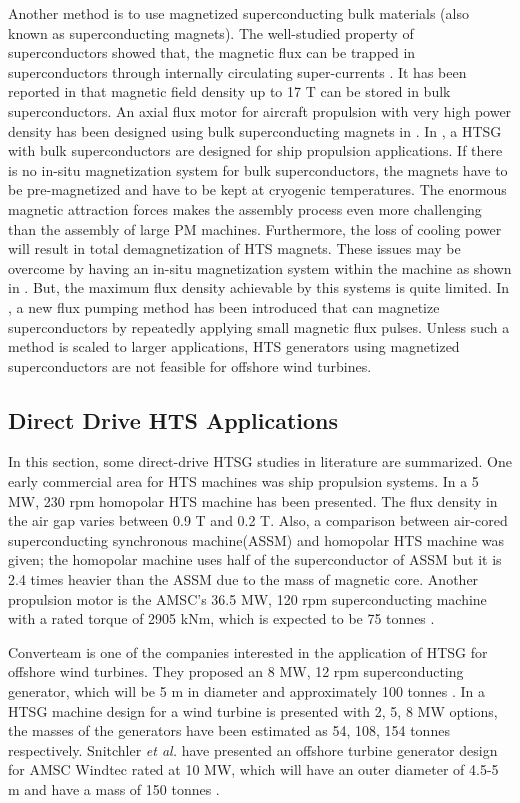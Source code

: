 \documentclass[final,peerreview,onecolumn]{IEEEtran}
\begin{document}
Another method is to use magnetized superconducting bulk materials (also known as superconducting magnets). The well-studied property of superconductors showed that, the magnetic flux can be trapped in superconductors through internally circulating super-currents \cite{Bray2009}. It has been reported in \cite{Tomita2003} that magnetic field density up to 17 T can be stored in bulk superconductors.  An axial flux motor for aircraft propulsion with very high power density has been designed using bulk superconducting magnets in \cite{Masson2007, Masson2007b}. In \cite{Matsuzaki2006}, a HTSG with bulk superconductors are designed for ship propulsion applications. If there is no in-situ magnetization system for bulk superconductors, the magnets have to be pre-magnetized and have to be kept at cryogenic temperatures. The enormous magnetic attraction forces makes the assembly process even more challenging than the assembly of large PM machines. Furthermore, the loss of cooling power will result in total demagnetization of HTS magnets. These issues may be overcome by having an in-situ magnetization system within the machine as shown in \cite{Masson2007}. But, the maximum flux density achievable by this systems is quite limited. In \cite{Coombs2009}, a new flux pumping method has been introduced that can magnetize superconductors by repeatedly applying small magnetic flux pulses.  Unless such a method is scaled to larger applications, HTS generators using magnetized superconductors are not feasible for offshore wind turbines.


\subsection{Direct Drive HTS Applications}
In this section, some direct-drive HTSG studies in literature are summarized. One early commercial area for HTS machines was ship propulsion systems. In \cite{Lee2008} a 5 MW, 230 rpm homopolar HTS machine has been presented. The flux density in the air gap varies between 0.9 T and 0.2 T. Also, a comparison between air-cored superconducting synchronous machine(ASSM) and homopolar HTS machine was given; the homopolar machine uses half of the superconductor of ASSM but it is 2.4 times heavier than the ASSM due to the mass of magnetic core. Another propulsion motor is the AMSC's 36.5 MW, 120 rpm  superconducting machine with a rated torque of 2905 kNm, which is expected to be 75 tonnes \cite{Kalsi2004,Snitchler2010}.

Converteam is one of the companies interested in the application of HTSG for offshore wind turbines. They proposed an 8 MW, 12 rpm superconducting generator, which will be 5 m in diameter and approximately 100 tonnes \cite{Lewis2007}. In \cite{Maki2008} a HTSG machine design for a wind turbine is presented with 2, 5, 8 MW options, the masses of the generators have been estimated as 54, 108, 154 tonnes respectively. Snitchler \textit{et al.} have presented an offshore turbine generator design for AMSC Windtec rated at 10 MW, which will have an outer diameter of 4.5-5 m and have a mass of 150 tonnes \cite{Snitchler2010}.
\end{document}
